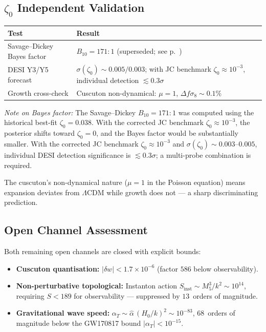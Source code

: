 \subsection{$\zeta_0$ Independent Validation}

\begin{center}
\begin{tabular}{l l}
\hline
Test & Result \\
\hline
Savage--Dickey Bayes factor & $B_{10} = 171\!:\!1$ (superseded; see p.~\pageref{note:bayes-caveat}) \\
DESI Y3/Y5 forecast & $\sigma(\zeta_0) \sim 0.005/0.003$; with JC benchmark $\zeta_0 \approx 10^{-3}$, individual detection $\lesssim 0.3\sigma$ \\
Growth cross-check & Cuscuton non-dynamical: $\mu = 1$, $\Delta f\sigma_8 \sim 0.1\%$ \\
\hline
\end{tabular}
\end{center}

\noindent
\textit{Note on Bayes factor:} The Savage--Dickey $B_{10} = 171\!:\!1$ was computed using the historical best-fit $\zeta_0 = 0.038$. With the corrected JC benchmark $\zeta_0 \approx 10^{-3}$, the posterior shifts toward $\zeta_0 = 0$, and the Bayes factor would be substantially smaller. With the corrected JC benchmark $\zeta_0 \approx 10^{-3}$ and $\sigma(\zeta_0) \sim 0.003$--$0.005$, individual DESI detection significance is $\lesssim 0.3\sigma$; a multi-probe combination is required.

\noindent
The cuscuton's non-dynamical nature ($\mu = 1$ in the Poisson equation) means expansion deviates from $\Lambda$CDM while growth does not --- a sharp discriminating prediction.

\subsection{Open Channel Assessment}

Both remaining open channels are closed with explicit bounds:
\begin{itemize}
\item \textbf{Cuscuton quantisation:} $|\delta w| < 1.7 \times 10^{-6}$ (factor $586$ below observability).
\item \textbf{Non-perturbative topological:} Instanton action $S_{\mathrm{inst}} \sim M_5^3/k^2 \sim 10^{14}$, requiring $S < 189$ for observability --- suppressed by $13$~orders of magnitude.
\item \textbf{Gravitational wave speed:} $\alpha_T \sim \hat{\alpha}\,(H_0/k)^2 \sim 10^{-83}$, 68~orders of magnitude below the GW170817 bound $|\alpha_T| < 10^{-15}$.
\end{itemize}

